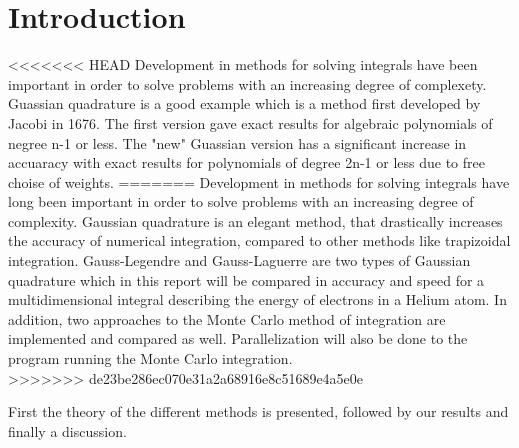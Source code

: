 \documentclass[../main.tex]{subfiles}
\begin{document}
\section{Introduction} \label{sec:intro}
<<<<<<< HEAD
Development in methods for solving integrals have been important in order to solve problems with an increasing degree of complexety. Guassian quadrature is a good example which is a method first developed by Jacobi in 1676. The first version gave exact results for algebraic polynomials of negree n-1 or less. The "new" Guassian version has a significant increase in accuaracy with exact results for polynomials of degree 2n-1 or less due to free choise of weights. \cite{Milovanovic2016}
=======
Development in methods for solving integrals have long been important in order to solve problems with an increasing degree of complexity. Gaussian quadrature is an elegant method, that drastically increases the accuracy of numerical integration, compared to other methods like trapizoidal integration. Gauss-Legendre and Gauss-Laguerre are two types of Gaussian quadrature which in this report will be compared in accuracy and speed for a multidimensional integral describing the energy of electrons in a Helium atom. In addition, two approaches to the Monte Carlo method of integration are implemented and compared as well. Parallelization will also be done to the program running the Monte Carlo integration.\\
>>>>>>> de23be286ec070e31a2a68916e8c51689e4a5e0e

First the theory of the different methods is presented, followed by our results and finally a discussion.
\end{document}

